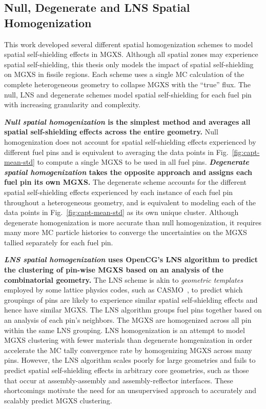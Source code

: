 \documentclass[12pt,twoside]{mitthesis-exec}
\begin{document}
\subsection*{Null, Degenerate and LNS Spatial Homogenization}

This work developed several different spatial homogenization schemes to model spatial self-shielding effects in MGXS. Although all spatial zones may experience spatial self-shielding, this thesis only models the impact of spatial self-shielding on MGXS in fissile regions. Each scheme uses a single MC calculation of the complete heterogeneous geometry to collapse MGXS with the ``true'' flux. The null, LNS and degenerate schemes model spatial self-shielding for each fuel pin with increasing granularity and complexity.

\textbf{\textit{Null spatial homogenization} is the simplest method and averages all spatial self-shielding effects across the entire geometry.} Null homogenization does not account for spatial self-shielding effects experienced by different fuel pins and is equivalent to averaging the data points in Fig.~\ref{fig:capt-mean-std} to compute a single MGXS to be used in all fuel pins. \textbf{\textit{Degenerate spatial homogenization} takes the opposite approach and assigns each fuel pin its own MGXS.} The degenerate scheme accounts for the different spatial self-shielding effects experienced by each instance of each fuel pin throughout a heterogeneous geometry, and is equivalent to modeling each of the data points in Fig.~\ref{fig:capt-mean-std} as its own unique cluster. Although degenerate homogenization is more accurate than null homogenization, it requires many more MC particle histories to converge the uncertainties on the MGXS tallied separately for each fuel pin.

\textbf{\textit{LNS spatial homogenization} uses OpenCG's LNS algorithm to predict the clustering of pin-wise MGXS based on an analysis of the combinatorial geometry.} The LNS scheme is akin to \textit{geometric templates} employed by some lattice physics codes, such as CASMO~\cite{rhodes2006casmo}, to predict which groupings of pins are likely to experience similar spatial self-shielding effects and hence have similar MGXS. The LNS algorithm groups fuel pins together based on an analysis of each pin's neighbors. The MGXS are homogenized across all pin within the same LNS grouping. LNS homogenization is an attempt to model MGXS clustering with fewer materials than degenerate homgenization in order accelerate the MC tally convergence rate by homogenizing MGXS across many pins. However, the LNS algorithm scales poorly for large geometries and fails to predict spatial self-shielding effects in arbitrary core geometries, such as those that occur at assembly-assembly and assembly-reflector interfaces. These shortcomings motivate the need for an unsupervised approach to accurately and scalably predict MGXS clustering.
\end{document}
